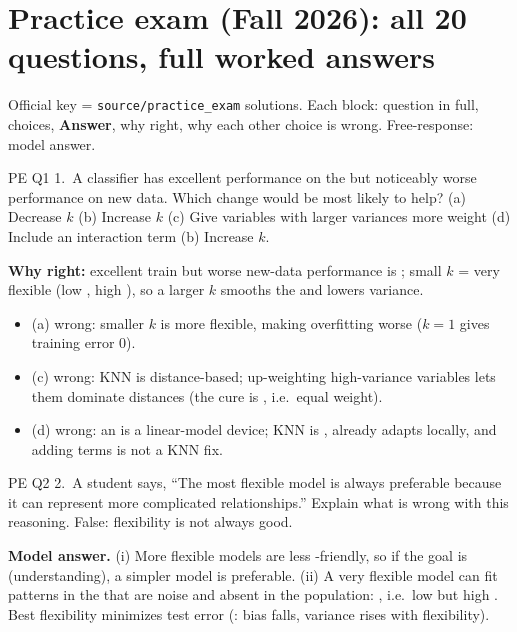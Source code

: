 \section{Practice exam (Fall 2026): all 20 questions, full worked answers}
{\small Official key = \texttt{source/practice\_exam} solutions. Each block: question in full, choices, \textbf{Answer}, why right, why each other choice is wrong. Free-response: model answer. \par}

\begin{qbox}{PE Q1}
1.~A  classifier has excellent performance on the  but noticeably worse performance on new data. Which change would be most likely to help?
(a) Decrease $k$ \quad (b) Increase $k$ \quad (c) Give variables with larger variances more weight \quad (d) Include an interaction term
\ans (b) Increase $k$.\par
\textbf{Why right:} excellent train but worse new-data performance is ; small $k$ = very flexible (low , high ), so a larger $k$ smooths the  and lowers variance. 
\begin{itemize}[leftmargin=1em,itemsep=0pt]
\item (a) wrong: smaller $k$ is more flexible, making overfitting worse ($k=1$ gives training error 0).
\item (c) wrong: KNN is distance-based; up-weighting high-variance variables lets them dominate distances (the cure is , i.e.\ equal weight).
\item (d) wrong: an  is a linear-model device; KNN is , already adapts locally, and adding terms is not a KNN fix.
\end{itemize}
\end{qbox}

\begin{qbox}{PE Q2}
2.~A student says, ``The most flexible model is always preferable because it can represent more complicated relationships.'' Explain what is wrong with this reasoning.
\ans False: flexibility is not always good.\par
\textbf{Model answer.} (i) More flexible models are less -friendly, so if the goal is  (understanding), a simpler model is preferable. (ii) A very flexible model can fit patterns in the  that are noise and absent in the population: , i.e.\ low  but high . Best flexibility minimizes test error (: bias falls, variance rises with flexibility). 
\end{qbox}

